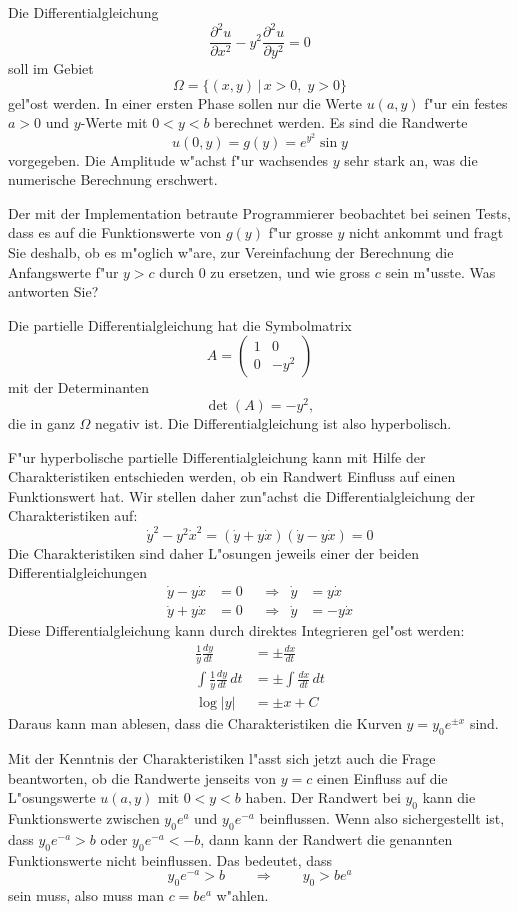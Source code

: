 Die Differentialgleichung
\[
\frac{\partial^2 u}{\partial x^2}-y^2\frac{\partial^2u}{\partial y^2}=0
\]
soll im Gebiet
\[
\Omega=\{(x,y)\,|\,x>0,\;y>0\}
\]
gel"ost werden.
In einer ersten Phase sollen nur die Werte $u(a,y)$ f"ur ein festes 
$a > 0$ und $y$-Werte mit $0<y<b$ berechnet werden.
Es sind die Randwerte
\[
u(0,y)=g(y)=e^{y^2}\sin y
\]
vorgegeben. Die Amplitude w"achst f"ur wachsendes $y$ sehr stark an,
was die numerische Berechnung erschwert.

Der mit der Implementation betraute Programmierer beobachtet bei seinen
Tests, dass es auf die Funktionswerte von $g(y)$ f"ur grosse
$y$ nicht ankommt und fragt Sie deshalb, ob es m"oglich w"are, zur
Vereinfachung der Berechnung die Anfangswerte f"ur $y>c$ durch
$0$ zu ersetzen, und wie gross $c$ sein m"usste. Was antworten Sie?

\begin{loesung}
Die partielle Differentialgleichung hat die Symbolmatrix
\[
A=
\begin{pmatrix}
1&0\\0&-y^2
\end{pmatrix}
\]
mit der Determinanten
\[
\det(A)=-y^2,
\]
die in ganz $\Omega$ negativ ist.
Die Differentialgleichung ist also hyperbolisch.

F"ur hyperbolische partielle Differentialgleichung kann mit Hilfe der
Charakteristiken entschieden werden, ob ein Randwert Einfluss auf einen
Funktionswert hat. Wir stellen daher zun"achst die Differentialgleichung
der Charakteristiken auf:
\[
\dot y^2-y^2\dot x^2=(\dot y+y\dot x)(\dot y-y\dot x)=0
\]
Die Charakteristiken sind daher L"osungen jeweils einer der beiden
Differentialgleichungen
\begin{align*}
\dot y-y\dot x&=0&&\Rightarrow&\dot y&=y\dot x\\
\dot y+y\dot x&=0&&\Rightarrow&\dot y&=-y\dot x
\end{align*}
Diese Differentialgleichung kann durch direktes Integrieren
gel"ost werden:
\begin{align*}
\frac1y\frac{dy}{dt}&=\pm\frac{dx}{dt}\\
\int \frac1y\frac{dy}{dt}\,dt&=\pm\int \frac{dx}{dt}\,dt\\
\log |y|&= \pm x + C
\end{align*}
Daraus kann man ablesen, dass die Charakteristiken die Kurven 
$y=y_0e^{\pm x}$ sind.

Mit der Kenntnis der Charakteristiken l"asst sich jetzt auch die 
Frage beantworten, ob die Randwerte jenseits von $y=c$ einen Einfluss
auf die L"osungswerte $u(a,y)$ mit $0<y<b$ haben. Der Randwert
bei $y_0$ kann die Funktionswerte zwischen $y_0e^a$ und $y_0e^{-a}$
beinflussen. Wenn also sichergestellt ist, dass $y_0e^{-a} > b$
oder $y_0e^{-a} < -b$, dann kann der Randwert die genannten Funktionswerte
nicht beinflussen. Das bedeutet, dass 
\[
y_0e^{-a}>b
\qquad\Rightarrow\qquad
y_0>be^a
\]
sein muss, also muss man $c=be^a$ w"ahlen.
\end{loesung}


